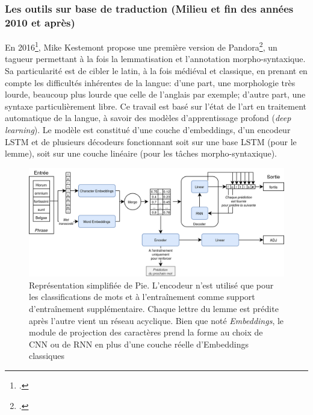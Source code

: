\subsubsection{Les outils sur base de traduction (Milieu et fin des années 2010 et après)}

En 2016\footcite{kestemont_initial_2016}, Mike Kestemont propose une première version de Pandora\footcite{kestemont_lemmatization_2017}, un tagueur permettant à la fois la lemmatisation et l'annotation morpho-syntaxique. Sa particularité est de cibler le latin, à la fois médiéval et classique, en prenant en compte les difficultés inhérentes de la langue: d'une part, une morphologie très lourde, beaucoup plus lourde que celle de l'anglais par exemple; d'autre part, une syntaxe particulièrement libre. Ce travail est basé sur l'état de l'art en traitement automatique de la langue, à savoir des modèles d'apprentissage profond (\textit{deep learning}). Le modèle est constitué d'une couche d'embeddings, d'un encodeur LSTM et de plusieurs décodeurs fonctionnant soit sur une base LSTM (pour le lemme), soit sur une couche linéaire (pour les tâches morpho-syntaxique).


\begin{figure}[h]
    \centering
    \includegraphics[width=\linewidth]{results/lemmatisation/outils/Pie.png}
    \caption{Représentation simplifiée de Pie. L'encodeur n'est utilisé que pour les classifications de mots et à l'entraînement comme support d'entraînement supplémentaire. Chaque lettre du lemme est prédite après l'autre vient un réseau acyclique. Bien que noté \textit{Embeddings}, le module de projection des caractères prend la forme au choix de CNN ou de RNN en plus d'une couche réelle d'Embeddings classiques}
    \label{lemmatisation:outils:pie}
\end{figure}

